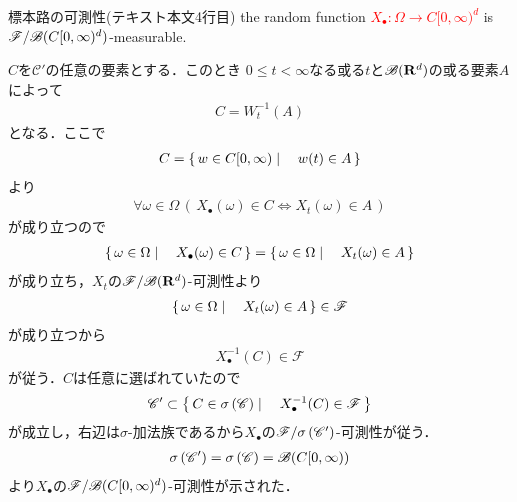 	\begin{itembox}[l]{標本路の可測性(テキスト本文4行目)}
		the random function \textcolor{red}{$X_\bullet:\Omega \longrightarrow C[0,\infty)^d$}
		is \textcolor{red}{$\mathscr{F}/\mathscr{B}(C[0,\infty)^d)$}-measurable.
	\end{itembox}
	
	\begin{sketch}
		$C$を$\mathscr{C}'$の任意の要素とする．このとき
		$0 \leq t < \infty$なる或る$t$と$\mathscr{B}(\mathbf{R}^d)$の或る要素$A$によって
		\begin{align}
			C = W_t^{-1}(A)
		\end{align}
		となる．ここで
		\begin{align}
			C = \left\{\, w \in C[0,\infty) \mid \quad w(t) \in A\, \right\}
		\end{align}
		より
		\begin{align}
			\forall \omega \in \Omega\,
			\left(\, X_\bullet(\omega) \in C \Longleftrightarrow X_t(\omega) \in A\, \right)
		\end{align}
		が成り立つので
		\begin{align}
			\left\{\, \omega \in \Omega \mid \quad X_\bullet(\omega) \in C\, \right\}
			= \left\{\, \omega \in \Omega \mid \quad X_t(\omega) \in A\, \right\}
		\end{align}
		が成り立ち，$X_t$の$\mathscr{F}/\mathscr{B}(\mathbf{R}^d)$-可測性より
		\begin{align}
			\left\{\, \omega \in \Omega \mid \quad X_t(\omega) \in A\, \right\} \in \mathscr{F}
		\end{align}
		が成り立つから
		\begin{align}
			X_{\bullet}^{-1}(C) \in \mathscr{F}
		\end{align}
		が従う．$C$は任意に選ばれていたので
		\begin{align}
			\mathscr{C}' \subset \left\{\, C \in \sigma \left(\mathscr{C}\right) \mid \quad X_{\bullet}^{-1}(C) \in \mathscr{F}\, \right\}
		\end{align}
		が成立し，右辺は$\sigma$-加法族であるから$X_\bullet$の$\mathscr{F}/\sigma \left(\mathscr{C}'\right)$-可測性が従う．
		\begin{align}
			\sigma \left(\mathscr{C}'\right) = \sigma \left(\mathscr{C}\right) = \mathscr{B}(C[0,\infty))
		\end{align}
		より$X_\bullet$の$\mathscr{F}/\mathscr{B}(C[0,\infty)^d)$-可測性が示された．
		\QED
	\end{sketch}
	
